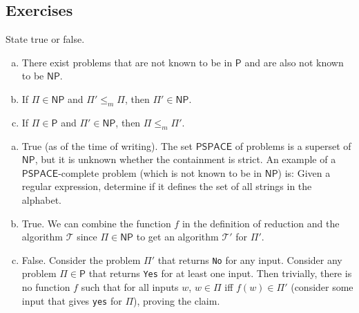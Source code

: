 \subsection{Exercises}
	
	\begin{exercise}
		State true or false.
		\begin{enumerate}[(a)]
			\item There exist problems that are not known to be in $\mathsf{P}$ and are also not known to be $\mathsf{NP}$.
			\item If $\mathsf{\Pi}\in\mathsf{NP}$ and $\mathsf{\Pi}' \leq_m \mathsf{\Pi}$, then $\mathsf{\Pi}'\in\mathsf{NP}$.
			\item If $\mathsf{\Pi}\in\mathsf{P}$ and $\mathsf{\Pi}'\in\mathsf{NP}$, then $\mathsf{\Pi}\leq_m\mathsf{\Pi}'$.
		\end{enumerate}
	\end{exercise}
	\begin{solution*}
		\begin{enumerate}[(a)]
			\item True (as of the time of writing). The set \href{https://en.wikipedia.org/wiki/PSPACE}{$\mathsf{PSPACE}$} of problems is a superset of $\mathsf{NP}$, but it is unknown whether the containment is strict. An example of a $\mathsf{PSPACE}$-complete problem (which is not known to be in $\mathsf{NP}$) is: Given a regular expression, determine if it defines the set of all strings in the alphabet.

			\item True. We can combine the function $f$ in the definition of reduction and the algorithm $\mathcal{T}$ since $\mathsf{\Pi} \in \mathsf{NP}$ to get an algorithm $\mathcal{T}'$ for $\mathsf{\Pi}'$.

			\item False. Consider the problem $\mathsf{\Pi}'$ that returns \texttt{No} for any input. Consider any problem $\mathsf{\Pi}\in\mathsf{P}$ that returns \texttt{Yes} for at least one input. Then trivially, there is no function $f$ such that for all inputs $w$, $w\in\mathsf{\Pi}$ iff $f(w)\in\mathsf{\Pi}'$ (consider some input that gives \texttt{yes} for $\mathsf{\Pi}$), proving the claim.
		\end{enumerate}
	\end{solution*}